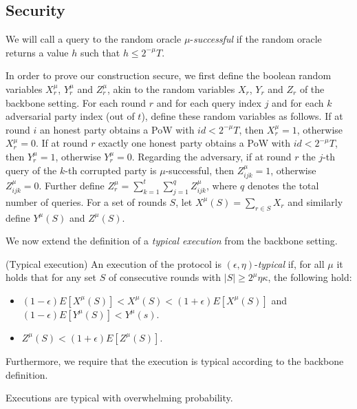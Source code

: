 \subsection{Security}

We will call a query to the random oracle $\mu$-\textit{successful} if the
random oracle returns a value $h$ such that $h \leq 2^{-\mu}T$.

In order to prove our construction secure, we first define the boolean random
variables $X_r^\mu$, $Y_r^\mu$ and $Z_r^\mu$, akin to the random variables
$X_r$, $Y_r$ and $Z_r$ of the backbone setting\cite{backbone}. For each round
$r$ and for each query index $j$ and for each $k$ adversarial party index (out
of $t$), define these random variables as follows.  If at round $i$ an honest
party obtains a PoW with $id < 2^{-\mu}T$, then $X_r^\mu = 1$, otherwise
$X_r^\mu = 0$. If at round $r$ exactly one honest party obtains a PoW with $id <
2^{-\mu}T$, then $Y_r^\mu = 1$, otherwise $Y_r^\mu = 0$. Regarding the
adversary, if at round $r$ the $j$-th query of the $k$-th corrupted party is
$\mu$-successful, then $Z^\mu_{ijk} = 1$, otherwise $Z^\mu_{ijk} = 0$. Further
define $Z^\mu_r = \sum_{k=1}^t \sum_{j=1}^q Z^\mu_{ijk}$, where $q$ denotes the
total number of queries. For a set of rounds $S$, let $X^\mu(S) = \sum_{r \in S}
X_r$ and similarly define $Y^\mu(S)$ and $Z^\mu(S)$.

We now extend the definition of a \textit{typical execution} from the backbone
setting\cite{backbone}.

\begin{definition}{(Typical execution)}
    An execution of the protocol is $(\epsilon, \eta)$-\textit{typical} if, for
    all $\mu$ it holds that for any set $S$ of consecutive rounds with $|S| \geq
    2^\mu \eta\kappa$, the following hold:

    \begin{itemize}
        \item $(1 - \epsilon)E[X^\mu(S)] < X^\mu(S) < (1 + \epsilon)E[X^\mu(S)]$ and $(1 - \epsilon)E[Y^\mu(S)] < Y^\mu(s)$.
        \item $Z^\mu(S) < (1 + \epsilon)E[Z^\mu(S)]$.
    \end{itemize}

    Furthermore, we require that the execution is typical according to the
    backbone definition.
\end{definition}

Executions are typical with overwhelming probability.

